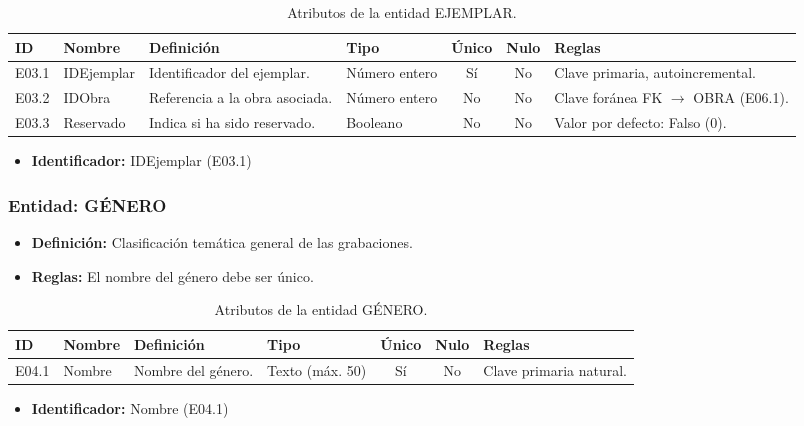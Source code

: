 \begin{table}[H]
	\centering
	\caption{Atributos de la entidad EJEMPLAR.}
	\label{tab:dict_ejemplar}
	\small
	\begin{tabularx}{\textwidth}{l l X l c c X}
		\toprule
		\textbf{ID} & \textbf{Nombre} & \textbf{Definición} & \textbf{Tipo} & \textbf{Único} & \textbf{Nulo} & \textbf{Reglas} \\
		\midrule
		E03.1 & IDEjemplar & Identificador del ejemplar. & Número entero & Sí & No & Clave primaria, autoincremental. \\
		\addlinespace
		E03.2 & IDObra & Referencia a la obra asociada. & Número entero & No & No & Clave foránea FK $\rightarrow$ OBRA (E06.1). \\
		\addlinespace
		E03.3 & Reservado & Indica si ha sido reservado. & Booleano & No & No & Valor por defecto: Falso (0). \\
		\bottomrule
	\end{tabularx}
\end{table}

\begin{itemize}
	\item\textbf{Identificador:} IDEjemplar (E03.1)
\end{itemize}

\subsubsection{Entidad: GÉNERO}
\begin{itemize}
	\item\textbf{Definición:} Clasificación temática general de las grabaciones.
	\item\textbf{Reglas:} El nombre del género debe ser único.
\end{itemize}

\begin{table}[H]
	\centering
	\caption{Atributos de la entidad GÉNERO.}
	\label{tab:dict_genero}
	\small
	\begin{tabularx}{\textwidth}{l l X l c c X}
		\toprule
		\textbf{ID} & \textbf{Nombre} & \textbf{Definición} & \textbf{Tipo} & \textbf{Único} & \textbf{Nulo} & \textbf{Reglas} \\
		\midrule
		E04.1 & Nombre & Nombre del género. & Texto (máx. 50) & Sí & No & Clave primaria natural. \\
		\bottomrule
	\end{tabularx}
\end{table}

\begin{itemize}
	\item\textbf{Identificador:} Nombre (E04.1)
\end{itemize}

